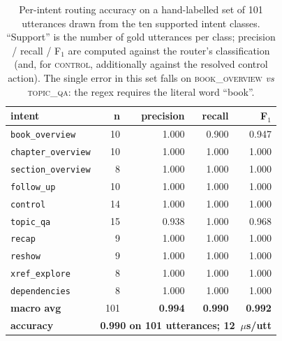 \begin{table}[!htbp]
\centering
\caption{Per-intent routing accuracy on a hand-labelled set of 101 utterances drawn from the ten supported intent classes.  ``Support'' is the number of gold utterances per class; precision / recall / F$_1$ are computed against the router's classification (and, for \textsc{control}, additionally against the resolved control action).  The single error in this set falls on \textsc{book\_overview} \textit{vs} \textsc{topic\_qa}: the regex requires the literal word ``book''.}
\label{tab:m1-routing}
\small
\begin{tabular}{lrrrr}
\toprule
intent & n & precision & recall & F$_1$ \\
\midrule
\texttt{book\_overview} &  10 & 1.000 & 0.900 & 0.947 \\
\texttt{chapter\_overview} &  10 & 1.000 & 1.000 & 1.000 \\
\texttt{section\_overview} &   8 & 1.000 & 1.000 & 1.000 \\
\texttt{follow\_up} &  10 & 1.000 & 1.000 & 1.000 \\
\texttt{control} &  14 & 1.000 & 1.000 & 1.000 \\
\texttt{topic\_qa} &  15 & 0.938 & 1.000 & 0.968 \\
\texttt{recap} &   9 & 1.000 & 1.000 & 1.000 \\
\texttt{reshow} &   9 & 1.000 & 1.000 & 1.000 \\
\texttt{xref\_explore} &   8 & 1.000 & 1.000 & 1.000 \\
\texttt{dependencies} &   8 & 1.000 & 1.000 & 1.000 \\
\midrule
\textbf{macro avg} & 101 & \textbf{0.994} & \textbf{0.990} & \textbf{0.992} \\
\textbf{accuracy} & \multicolumn{4}{c}{\textbf{0.990 on 101 utterances; 12~$\mu$s/utt}} \\
\bottomrule
\end{tabular}
\end{table}

